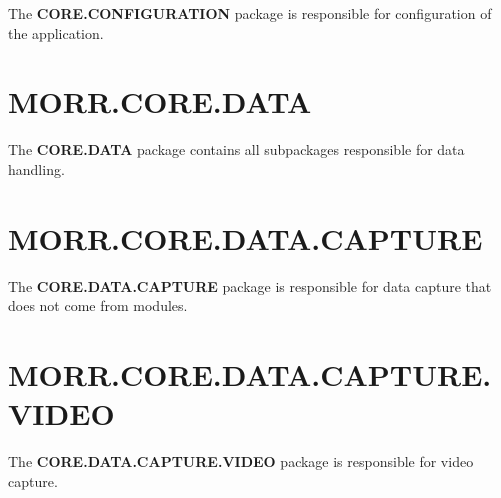 The \textbf{CORE.CONFIGURATION} package is responsible for configuration of the application.

\begin{packif}
\end{packif}

\begin{packclass}
\end{packclass}

\section*{MORR.CORE.DATA}

The \textbf{CORE.DATA} package contains all subpackages responsible for data handling.

\begin{packpack}
\end{packpack}

\section*{MORR.CORE.DATA.CAPTURE}

The \textbf{CORE.DATA.CAPTURE} package is responsible for data capture that does not come from modules.

\begin{packclass}
\end{packclass}

\begin{packpack}
\end{packpack}

\section*{MORR.CORE.DATA.CAPTURE.VIDEO}

The \textbf{CORE.DATA.CAPTURE.VIDEO} package is responsible for video capture.

\begin{packclass}
\end{packclass}

\begin{packpack}
\end{packpack}

